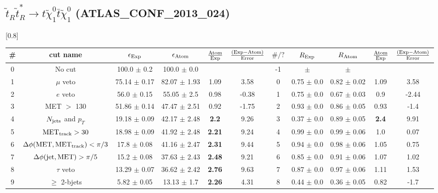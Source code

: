 \documentclass[12pt]{article}
\begin{document}
    
\subsection*{$\tilde t_R \tilde t_R^* \to t \tilde \chi_1^0 \bar t \tilde \chi_1^0$ (ATLAS\_CONF\_2013\_024)} 


\renewcommand{\arraystretch}{1.3}
\begin{table}[h!]
\begin{center}
\scalebox{0.7}[0.8]{ 
\begin{tabular}{c|c||c|c|>{\columncolor{yellow}}c|c||c|c|c|>{\columncolor{yellow}}c|c}
\hline
\# & cut name & $\epsilon_{\rm Exp}$ & $\epsilon_{\rm Atom}$ & $\frac{\rm Atom}{\rm Exp}$ & $\frac{({\rm Exp} - {\rm Atom})}{\rm Error}$ & $\#/?$ & $R_{\rm Exp}$ & $R_{\rm Atom}$ & $\frac{\rm Atom}{\rm Exp}$ & $\frac{({\rm Exp} - {\rm Atom})}{\rm Error}$ \\
\hline
0 & No cut & 100.0 $\pm$ 0.2 & 100.0 $\pm$ 0.0 &  &  & -1 &  $\pm$  &  $\pm$  &  &  \\
1 & $\mu$ veto & 75.14 $\pm$ 0.17 & 82.07 $\pm$ 1.93 & 1.09 & 3.58 & 0 & 0.75 $\pm$ 0.0 & 0.82 $\pm$ 0.02 & 1.09 & 3.58 \\
2 & $e$ veto & 56.0 $\pm$ 0.15 & 55.05 $\pm$ 2.5 & 0.98 & -0.38 & 1 & 0.75 $\pm$ 0.0 & 0.67 $\pm$ 0.03 & 0.9 & -2.44 \\
3 & MET $>$ 130 & 51.86 $\pm$ 0.14 & 47.47 $\pm$ 2.51 & 0.92 & -1.75 & 2 & 0.93 $\pm$ 0.0 & 0.86 $\pm$ 0.05 & 0.93 & -1.4 \\
4 & \cellcolor{magenta} $N_{\rm jets}$ and $p_T$ & 19.18 $\pm$ 0.09 & 42.17 $\pm$ 2.48 & \color{red}\bf 2.2 & 9.26 & 3 & 0.37 $\pm$ 0.0 & 0.89 $\pm$ 0.05 & \color{red}\bf 2.4 & 9.91 \\
5 & $\rm MET_{track} > 30$ & 18.98 $\pm$ 0.09 & 41.92 $\pm$ 2.48 & \color{red}\bf 2.21 & 9.24 & 4 & 0.99 $\pm$ 0.0 & 0.99 $\pm$ 0.06 & 1.0 & 0.07 \\
6 & $\Delta \phi (\rm MET, MET_{track}) < \pi/3$ & 17.8 $\pm$ 0.08 & 41.16 $\pm$ 2.47 & \color{red}\bf 2.31 & 9.44 & 5 & 0.94 $\pm$ 0.0 & 0.98 $\pm$ 0.06 & 1.05 & 0.75 \\
7 & $\Delta \phi (\rm jet, MET) > \pi/5$ & 15.2 $\pm$ 0.08 & 37.63 $\pm$ 2.43 & \color{red}\bf 2.48 & 9.21 & 6 & 0.85 $\pm$ 0.0 & 0.91 $\pm$ 0.06 & 1.07 & 1.02 \\
8 & $\tau$ veto & 13.29 $\pm$ 0.07 & 36.62 $\pm$ 2.42 & \color{red}\bf 2.76 & 9.63 & 7 & 0.87 $\pm$ 0.0 & 0.97 $\pm$ 0.06 & 1.11 & 1.53 \\
9 & $\ge$ 2-bjets & 5.82 $\pm$ 0.05 & 13.13 $\pm$ 1.7 & \color{red}\bf 2.26 & 4.31 & 8 & 0.44 $\pm$ 0.0 & 0.36 $\pm$ 0.05 & 0.82 & -1.7 \\

\end{tabular}}
\end{center}
\end{table}
\end{document}
